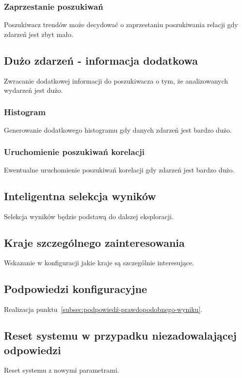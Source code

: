 \documentclass[11pt]{report}
\begin{document}
    \subsubsection{Zaprzestanie poszukiwań}
    Poszukiwacz trendów może decydować o zaprzestaniu poszukiwania relacji gdy zdarzeń jest zbyt mało.

    \subsection{Dużo zdarzeń - informacja dodatkowa}
    Zwracanie dodatkowej informacji do poszukiwacza o tym, że analizowanych wydarzeń jest dużo.

    \subsubsection{Histogram}
    Generowanie dodatkowego histogramu gdy danych zdarzeń jest bardzo dużo.

    \subsubsection{Uruchomienie poszukiwań korelacji}
    Ewentualne uruchomienie poszukiwań korelacji gdy zdarzeń jest bardzo dużo.

    \subsection{Inteligentna selekcja wyników}
    Selekcja wyników będzie podstawą do dalszej eksploracji.

    \subsection{Kraje szczególnego zainteresowania}
    Wskazanie w konfiguracji jakie kraje są szczególnie interesujące.

    \subsection{Podpowiedzi konfiguracyjne}\label{subsec:podpowiedzi-konfiguracyjne}
    Realizacja punktu~\ref{subsec:podpowiedź-prawdopodobnego-wyniku}.

    \subsection{Reset systemu w przypadku niezadowalającej odpowiedzi}
    Reset systemu z nowymi parametrami.
\end{document}
